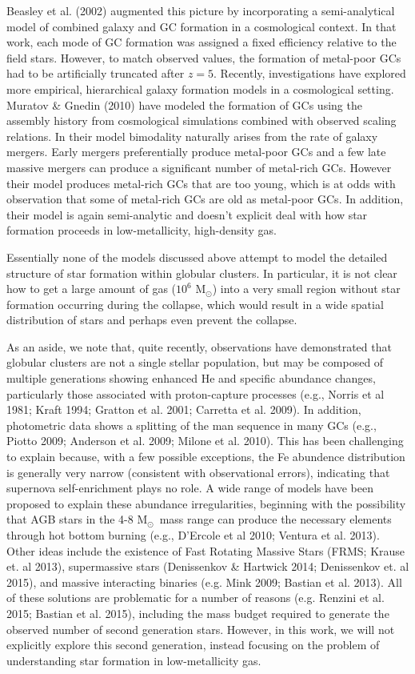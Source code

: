 \documentclass[useAMS,usenatbib]{mn2e}
\newcommand{\msun}{{M$_\odot$}}
\begin{document}
Beasley et al. (2002) augmented this picture by incorporating a semi-analytical model of combined galaxy and GC formation in a cosmological context. In that work, each mode of GC formation was assigned a fixed efficiency relative to the field stars. However, to match observed values, the formation of metal-poor GCs had to be artificially truncated after $z = 5$. Recently, investigations have explored more empirical, hierarchical galaxy formation models in a cosmological setting.   Muratov \& Gnedin (2010) have modeled the formation of GCs using the assembly history from cosmological simulations combined with observed scaling relations. In their model bimodality naturally arises from the rate of galaxy mergers. Early mergers preferentially produce metal-poor GCs and a few late massive mergers can produce a significant number of metal-rich GCs.  However their model produces metal-rich GCs that are too young, which is at odds with observation that some of metal-rich GCs are old as metal-poor GCs. In addition, their model is again semi-analytic and doesn't explicit deal with how star formation proceeds in low-metallicity, high-density gas.

Essentially none of the models discussed above attempt to model the detailed structure of star formation within globular clusters.  In particular, it is not clear how to get a large amount of gas ($10^6$ \msun) into a very small region without star formation occurring during the collapse, which would result in a wide spatial distribution of stars and perhaps even prevent the collapse.  

As an aside, we note that, quite recently, observations have demonstrated that globular clusters are not a single stellar population, but may be composed of multiple generations showing enhanced He and specific abundance changes, particularly those associated with proton-capture processes (e.g., Norris et al 1981; Kraft 1994; Gratton et al. 2001; Carretta et al. 2009).  In addition, photometric data shows a splitting of the man sequence in many GCs (e.g., Piotto 2009; Anderson et al. 2009; Milone et al. 2010).  This has been challenging to explain because, with a few possible exceptions, the Fe abundence distribution is generally very narrow (consistent with observational errors), indicating that supernova self-enrichment plays no role.  A wide range of models have been proposed to explain these abundance irregularities, beginning with the possibility that AGB stars in the 4-8 \msun\ mass range can produce the necessary elements through hot bottom burning (e.g., D'Ercole et al 2010; Ventura et al. 2013).  Other ideas include the existence of Fast Rotating Massive Stars (FRMS; Krause et. al 2013), supermassive stars (Denissenkov \& Hartwick 2014; Denissenkov et. al 2015), and massive interacting binaries (e.g. Mink 2009; Bastian et al. 2013).  All of these solutions are problematic for a number of reasons (e.g. Renzini et al. 2015; Bastian et al. 2015), including the mass budget required to generate the observed number of second generation stars.  However, in this work, we will not explicitly explore this second generation, instead focusing on the problem of understanding star formation in low-metallicity gas.
\end{document}
